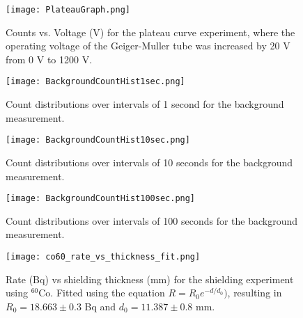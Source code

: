 \begin{figure}[H]
	\centering
	\texttt{[image: PlateauGraph.png]}
	\caption{Counts vs. Voltage (V) for the plateau curve experiment, where the operating voltage of the Geiger-Muller tube was increased by 20 V from 0 V to 1200 V.}
\end{figure}

\begin{figure}[H]
	\centering
	\texttt{[image: BackgroundCountHist1sec.png]}
	\caption{Count distributions over intervals of 1 second for the background measurement.}
\end{figure}

\begin{figure}[H]
	\centering
	\texttt{[image: BackgroundCountHist10sec.png]}
	\caption{Count distributions over intervals of 10 seconds for the background measurement.}
\end{figure}

\begin{figure}[H]
	\centering
	\texttt{[image: BackgroundCountHist100sec.png]}
	\caption{Count distributions over intervals of 100 seconds for the background measurement.}
\end{figure}

\begin{table}[H]
    \centering
     \label{tab:at} 
    
\end{table}

\begin{figure}[H]
	\centering
	\texttt{[image: co60\_rate\_vs\_thickness\_fit.png]}
	\caption{Rate (Bq) vs shielding thickness (mm) for the shielding experiment using $^{60}$Co. Fitted using the equation $R = R_0 e^{-d/d_0})$, resulting in $R_0 = 18.663 \pm 0.3$ Bq and $d_0 = 11.387 \pm 0.8$ mm.}
\end{figure}

\pagebreak



